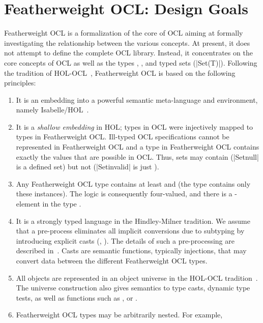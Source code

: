 \section{Featherweight OCL: Design Goals}
Featherweight OCL is a formalization of the core of OCL
aiming at formally investigating the relationship between the
various concepts. At present, it does not attempt to define the complete
OCL library. Instead, it concentrates on the core concepts of
OCL as well as the types ,
, and typed sets (\inlineocl|Set(T)|).  Following
the tradition of
HOL-OCL~\cite{brucker.ea:hol-ocl:2008,brucker.ea:hol-ocl-book:2006},
Featherweight OCL is based on the following principles:
\begin{enumerate}
\item It is an embedding into a powerful semantic meta-language and
  environment, namely
  Isabelle/HOL~\cite{nipkow.ea:isabelle:2002}.
\item It is a \emph{shallow embedding} in HOL; types
  in OCL were injectively mapped to types in Featherweight
  OCL\@. Ill-typed OCL specifications cannot be represented in
  Featherweight OCL and a type in Featherweight OCL contains exactly
  the values that are possible in OCL\@. Thus, sets may contain
   (\inlineocl|Set{null}| is a defined set) but not
   (\inlineocl|Set{invalid}| is just
  ).
\item Any Featherweight OCL type contains at least
   and  (the type 
  contains only these instances). The logic is consequently
  four-valued, and there is a -element in the type
  .
\item It is a strongly typed language in the Hindley-Milner tradition.
  We assume that a pre-process eliminates all implicit conversions due
  to subtyping by introducing explicit casts (\eg,
  ). The details of such a pre-processing are
  described in~\cite{brucker:interactive:2007}.  Casts are semantic
  functions, typically injections, that may convert data between the
  different Featherweight OCL types.
\item All objects are represented in an object universe in the HOL-OCL
  tradition~\cite{brucker.ea:extensible:2008-b}. The universe
  construction also gives semantics to type casts, dynamic type
  tests, as well as functions such as ,
  or .
\item Featherweight OCL types may be arbitrarily nested. For example,

\end{enumerate}
